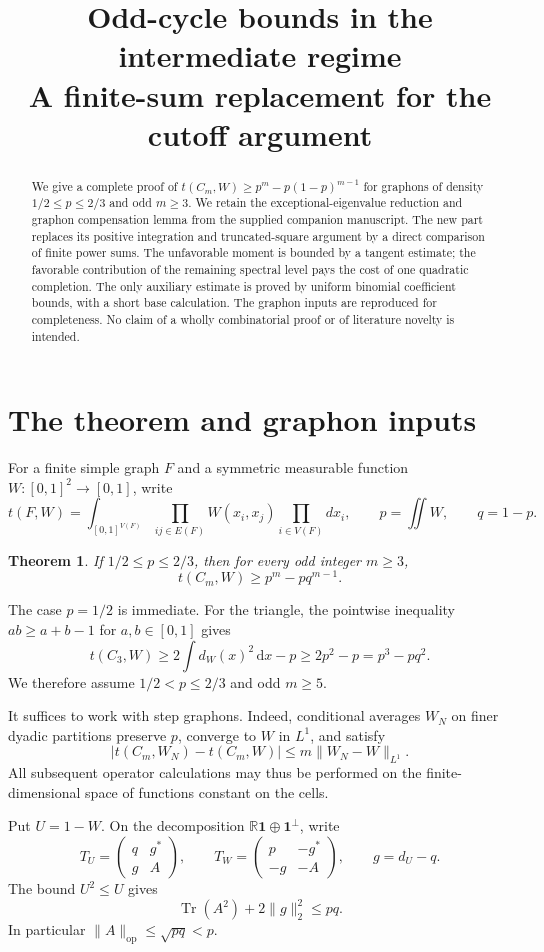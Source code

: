 \documentclass[11pt]{article}
\title{Odd-cycle bounds in the intermediate regime\\[3pt]
\large A finite-sum replacement for the cutoff argument}
\author{}
\date{}
\newtheorem{theorem}{Theorem}
\theoremstyle{remark}
\newcommand{\one}{\mathbf 1}
\newcommand{\Tr}{\operatorname{Tr}}
\newcommand{\norm}[1]{\lVert #1\rVert_2}
\newcommand{\dd}{\,\mathrm d}
\begin{document}
\maketitle

\begin{abstract}
We give a complete proof of $t(C_m,W)\ge p^m-p(1-p)^{m-1}$ for graphons of density $1/2\le p\le2/3$ and odd $m\ge3$. We retain the exceptional-eigenvalue reduction and graphon compensation lemma from the supplied companion manuscript. The new part replaces its positive integration and truncated-square argument by a direct comparison of finite power sums. The unfavorable moment is bounded by a tangent estimate; the favorable contribution of the remaining spectral level pays the cost of one quadratic completion. The only auxiliary estimate is proved by uniform binomial coefficient bounds, with a short base calculation. The graphon inputs are reproduced for completeness. No claim of a wholly combinatorial proof or of literature novelty is intended.
\end{abstract}

\section{The theorem and graphon inputs}

For a finite simple graph $F$ and a symmetric measurable function $W:[0,1]^2\to[0,1]$, write
\[
 t(F,W)=\int_{[0,1]^{V(F)}}\prod_{ij\in E(F)}W(x_i,x_j)
          \prod_{i\in V(F)}dx_i,
 \qquad p=\iint W,\qquad q=1-p.
\]

\begin{theorem}\label{thm:main}
If $1/2\le p\le2/3$, then for every odd integer $m\ge3$,
\[
 t(C_m,W)\ge p^m-pq^{m-1}.
\]
\end{theorem}

The case $p=1/2$ is immediate. For the triangle, the pointwise inequality $ab\ge a+b-1$ for $a,b\in[0,1]$ gives
\[
 t(C_3,W)\ge2\int d_W(x)^2\dd x-p\ge2p^2-p=p^3-pq^2.
\]
We therefore assume $1/2<p\le2/3$ and odd $m\ge5$.

It suffices to work with step graphons. Indeed, conditional averages $W_N$ on finer dyadic partitions preserve $p$, converge to $W$ in $L^1$, and satisfy
\[
 |t(C_m,W_N)-t(C_m,W)|\le m\lVert W_N-W\rVert_{L^1}.
\]
All subsequent operator calculations may thus be performed on the finite-dimensional space of functions constant on the cells.

Put $U=1-W$. On the decomposition $\mathbb R\one\oplus\one^\perp$, write
\begin{equation}\label{eq:blocks}
 T_U=\begin{pmatrix}q&g^*\\g&A\end{pmatrix},
 \qquad
 T_W=\begin{pmatrix}p&-g^*\\-g&-A\end{pmatrix},
 \qquad g=d_U-q.
\end{equation}
The bound $U^2\le U$ gives
\begin{equation}\label{eq:HS}
 \Tr(A^2)+2\norm g^2\le pq.
\end{equation}
In particular $\lVert A\rVert_{\mathrm{op}}\le\sqrt{pq}<p$.
\end{document}
